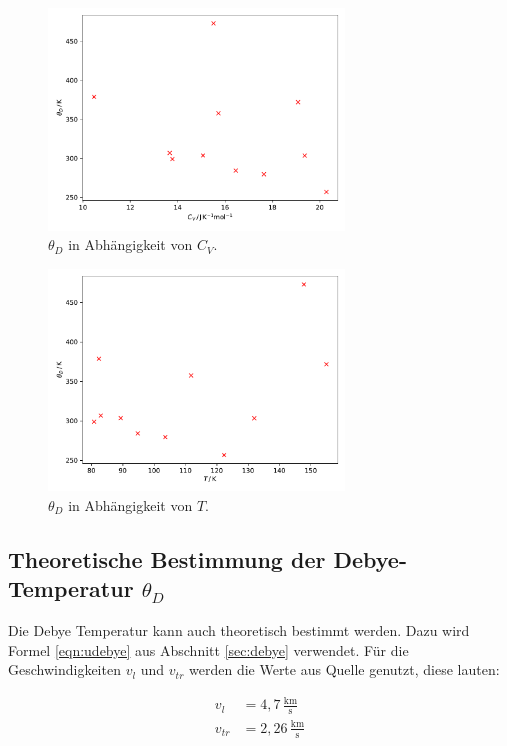 \begin{figure}[H]
    \centering
    \includegraphics[width=0.7\textwidth]{build/Theta_C_V.pdf}
    \caption{$\theta_D$ in Abhängigkeit von $C_V$.}
    \label{fig:Theta_C_V}
\end{figure}

\begin{figure}[H]
    \centering
    \includegraphics[width=0.7\textwidth]{build/Theta_T.pdf}
    \caption{$\theta_D$ in Abhängigkeit von $T$.}
    \label{fig:Theta_T}
\end{figure}

\subsection[Theoretische Bestimmung der Debye-Temperatur]{Theoretische Bestimmung der Debye-Temperatur $\theta_D$}
\label{sec:theo_debye_temp}

Die Debye Temperatur kann auch theoretisch bestimmt werden. Dazu wird Formel \eqref{eqn:udebye} aus Abschnitt \ref{sec:debye} verwendet. Für die Geschwindigkeiten $v_l$ und $v_{tr}$ werden die Werte aus Quelle \cite{Anleitung} genutzt, diese lauten:

\begin{align*}
    v_l &=  4, \! 7 \, \frac{\mathrm{km}}{\mathrm{s}} \\
    v_{tr} &= 2, \! 26 \, \frac{\mathrm{km}}{\mathrm{s}}
\end{align*}

